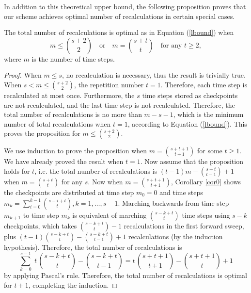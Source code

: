 \documentclass[oneeqnum, onethmnum, onefignum, onetabnum]{siamltex}
\begin{document}
In addition to this theoretical upper bound, the following proposition proves
that our scheme achieves optimal number of recalculations in certain special
cases.
\begin{proposition}
The total number of recalculations is optimal as in Equation (\ref{lbound}) when
\[ m \le \binom{s+2}{2} \quad \mbox{or} \quad
   m = \binom{s+t}{t} \quad \mbox{for any } t \ge 2 ,\]
where $m$ is the number of time steps.
\end{proposition}
\begin{proof}
When $m \le s$, no recalculation is necessary, thus the result is
trivially true.
When $s < m \le \binom{s+2}{2}$, the repetition number $t = 1$.
Therefore, each time step is recalculated at most once.  Furthermore, the
$s$ time steps stored as checkpoints are not recalculated, and the last
time step is not recalculated.  Therefore, the total number of recalculations is
no more than $m - s - 1$, which is the minimum number of total
recalculations when $t=1$, according to Equation (\ref{lbound}).
This proves the proposition for $m \le \binom{s+2}{2}$.

We use induction to prove the proposition when
$m = \binom{s+t+1}{t+1}$ for some $t \ge 1$.
We have already proved the result when $t = 1$.
Now assume that the proposition holds for $t$,
i.e. the total number of recalculations is
$(t-1) m - \binom{s + t}{t-1} + 1$
when $m = \binom{s + t}{t}$ for any $s$.
Now when $m = \binom{s + t + 1}{t + 1}$, Corollary
\ref{cor0} shows the checkpoints are distributed at time step $m_0=0$ and
time steps
$m_k = \sum_{i=0}^{k-1}\binom{s-i+t}{t}, k=1,\ldots,s-1$.
Marching backwards from time step $m_{k+1}$ to time step $m_k$ is
equivalent of marching $\binom{s-k+t}{t}$ time steps using
$s-k$ checkpoints, which takes $\binom{s-k+t}{t} - 1$
recalculations in the first forward sweep, plus
$(t-1) \binom{s-k+t}{t} - \binom{s-k+t}{t-1} + 1$
recalculations (by the induction hypothesis).
Therefore, the total number of recalculations is
\[ \sum_{k=0}^{s-1} \; t\, \binom{s-k+t}{t}
 - \binom{s-k+t}{t-1}
 = t\, \binom{s+t+1}{t+1} - \binom{s+t+1}{t} + 1 \]
by applying Pascal's rule.  Therefore, the total number of recalculations
is optimal for $t+1$, completing the induction.
\end{proof}
\end{document}
